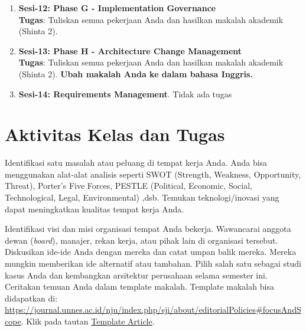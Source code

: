 \begin{enumerate}
	\item \textbf{Sesi-12: Phase G - Implementation Governance} \\
	\textbf{Tugas}: Tuliskan semua pekerjaan Anda dan hasilkan makalah akademik (Shinta 2).
	
	\item \textbf{Sesi-13: Phase H - Architecture Change Management} \\
	\textbf{Tugas}: Tuliskan semua pekerjaan Anda dan hasilkan makalah akademik (Shinta 2). \textbf{Ubah makalah Anda ke dalam bahasa Inggris.}
	
	\item \textbf{Sesi-14: Requirements Management}. Tidak ada tugas
\end{enumerate}


\section{Aktivitas Kelas dan Tugas}
Identifikasi satu masalah atau peluang di tempat kerja Anda. Anda bisa menggunakan alat-alat analisis seperti SWOT (Strength, Weakness, Opportunity, Threat), Porter's Five Forces, PESTLE (Political, Economic, Social, Technological, Legal, Environmental) ,dsb. Temukan teknologi/inovasi yang dapat meningkatkan kualitas tempat kerja Anda.

Identifikasi visi dan misi organisasi tempat Anda bekerja. Wawancarai anggota dewan (\textit{board}), manajer, rekan kerja, atau pihak lain di organisasi tersebut. Diskusikan ide-ide Anda dengan mereka dan catat umpan balik mereka. Mereka mungkin memberikan ide alternatif atau tambahan. Pilih salah satu sebagai studi kasus Anda dan kembangkan arsitektur perusahaan selama semester ini. Ceritakan temuan Anda dalam template makalah. Template makalah bisa didapatkan di: \url{https://journal.unnes.ac.id/nju/index.php/sji/about/editorialPolicies#focusAndScope}. Klik pada tautan \href{https://docs.google.com/document/d/13pIvz0OUnRtcnNZAcdfQGST5BSpx7LA3/edit}{\textsf{Template Article}}.
